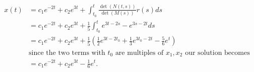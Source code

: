 \documentclass[12pt, letterpaper]{article}
\begin{document}
\begin{enumerate}
	 \begin{align*}
	 	x(t) &= c_1 e^{-2t} + c_2 e^{3t} +  \int_{t_0}^t \frac{\det(N(t,s))}{\det(M(s))} r(s) ds\\
	 	&= c_1 e^{-2t} + c_2 e^{3t} + \frac{1}{5} \int_{t_0}^te^{3t -2s} -e^{3s-2t} ds\\
	 	&=  c_1 e^{-2t} + c_2 e^{3t} + \frac{1}{5}  (\frac{1}{2} e^{3t - 2 t_0} + \frac{1}{3} e^{3 t_0 - 2 t} - \frac{5}{6} e^t)\\
	 	&\text{since the two terms with } t_0 \text{ are multiples of } x_1, x_2 \text{ our solution becomes}\\
	 	&= c_1 e^{-2t} + c_2 e^{3t} -\frac{1}{6} e^t.
	 \end{align*}
\end{enumerate}
\end{document}
